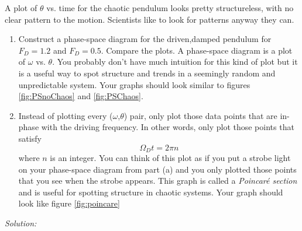 \begin{enumerate}
\probtwo A plot of $\theta$ vs. time for the chaotic pendulum looks
pretty structureless, with no clear pattern to the motion.  Scientists
like to look for patterns anyway they can.   
\begin{enumerate}
\item Construct a phase-space diagram for the driven,damped pendulum
  for $F_D = 1.2$ and $F_D = 0.5$.  Compare the plots.  A phase-space
  diagram is a plot of $\omega$ vs. $\theta$.  You probably don't have
  much intuition for this kind of plot but it is a useful way to spot
  structure and trends in a seemingly random and unpredictable system.
  Your graphs should look similar to figures \ref{fig:PSnoChaos} and
  \ref{fig:PSChaos}.
\item Instead of plotting every ($\omega$,$\theta$) pair, only plot those data points that are in-phase with
  the driving frequency.  In other words, only plot those points that
  satisfy
\begin{equation}
\Omega_D t = 2 \pi n
\end{equation}
where $n$ is an integer.  You can think of this plot as if you put a
strobe light on your phase-space diagram from part (a) and you only
plotted those points that you see when the strobe appears.  This graph
is called a \textit{Poincar\'{e} section} and is useful for spotting
structure in chaotic systems. Your graph should look like figure
\ref{fig:poincare}

\end{enumerate}
\end{enumerate}
\ifsolutions
\textit{Solution:}\\
